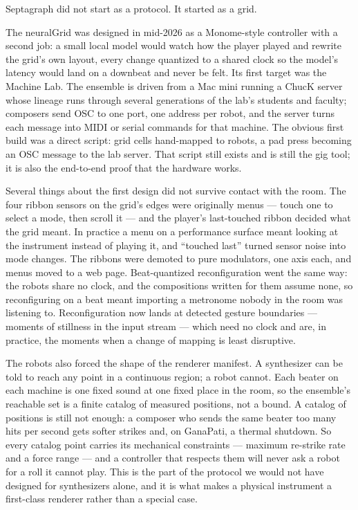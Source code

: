 
Septagraph did not start as a protocol. It started as a grid.

The neuralGrid was designed in mid-2026 as a Monome-style controller
with a second job: a small local model would watch how the player
played and rewrite the grid's own layout, every change quantized to a
shared clock so the model's latency would land on a downbeat and never
be felt. Its first target was the Machine Lab. The ensemble is driven
from a Mac mini running a ChucK server whose lineage runs through
several generations of the lab's students and faculty; composers send
OSC to one port, one address per robot, and the server turns each
message into MIDI or serial commands for that machine. The obvious
first build was a direct script: grid cells hand-mapped to robots, a
pad press becoming an OSC message to the lab server. That script still
exists and is still the gig tool; it is also the end-to-end proof that
the hardware works.

Several things about the first design did not survive contact with the
room. The four ribbon sensors on the grid's edges were originally
menus --- touch one to select a mode, then scroll it --- and the
player's last-touched ribbon decided what the grid meant. In practice a
menu on a performance surface meant looking at the instrument instead
of playing it, and ``touched last'' turned sensor noise into mode
changes. The ribbons were demoted to pure modulators, one axis each,
and menus moved to a web page. Beat-quantized reconfiguration went the
same way: the robots share no clock, and the compositions written for
them assume none, so reconfiguring on a beat meant importing a
metronome nobody in the room was listening to. Reconfiguration now
lands at detected gesture boundaries --- moments of stillness in the
input stream --- which need no clock and are, in practice, the moments
when a change of mapping is least disruptive.

The robots also forced the shape of the renderer manifest. A
synthesizer can be told to reach any point in a continuous region; a
robot cannot. Each beater on each machine is one fixed sound at one
fixed place in the room, so the ensemble's reachable set is a finite
catalog of measured positions, not a bound. A catalog of positions is
still not enough: a composer who sends the same beater too many hits
per second gets softer strikes and, on GanaPati, a thermal shutdown.
So every catalog point carries its mechanical constraints --- maximum
re-strike rate and a force range --- and a controller that respects
them will never ask a robot for a roll it cannot play. This is the
part of the protocol we would not have designed for synthesizers
alone, and it is what makes a physical instrument a first-class
renderer rather than a special case.

